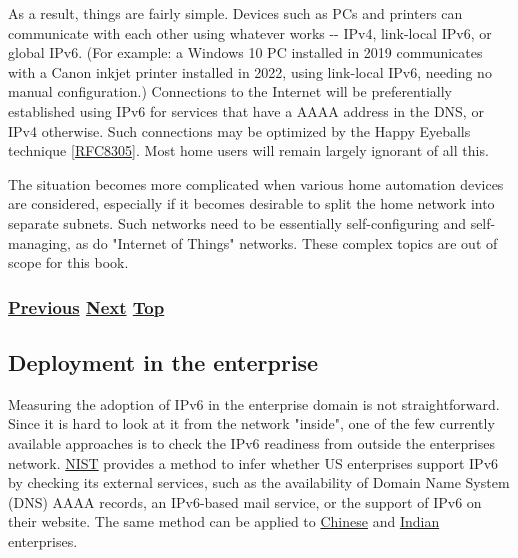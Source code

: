 \documentclass[
]{article}
\begin{document}
As a result, things are fairly simple. Devices such as PCs and printers
can communicate with each other using whatever works -\/- IPv4,
link-local IPv6, or global IPv6. (For example: a Windows 10 PC installed
in 2019 communicates with a Canon inkjet printer installed in 2022,
using link-local IPv6, needing no manual configuration.) Connections to
the Internet will be preferentially established using IPv6 for services
that have a AAAA address in the DNS, or IPv4 otherwise. Such connections
may be optimized by the Happy Eyeballs technique
{[}\href{https://www.rfc-editor.org/info/rfc8305}{RFC8305}{]}. Most home
users will remain largely ignorant of all this.

The situation becomes more complicated when various home automation
devices are considered, especially if it becomes desirable to split the
home network into separate subnets. Such networks need to be essentially
self-configuring and self-managing, as do "Internet of Things" networks.
These complex topics are out of scope for this book.

\subsubsection{\texorpdfstring{\hyperref[deployment-by-carriers]{Previous}
\hyperref[deployment-in-the-enterprise]{Next}
\hyperref[deployment-status]{Top}}{Previous Next Top}}\label{previous-next-top-36}

\pagebreak

\subsection{Deployment in the
enterprise}\label{deployment-in-the-enterprise}

Measuring the adoption of IPv6 in the enterprise domain is not
straightforward. Since it is hard to look at it from the network
"inside", one of the few currently available approaches is to check the
IPv6 readiness from outside the enterprise\textquotesingle s network.
\href{https://fedv6-deployment.antd.nist.gov/cgi-bin/generate-com}{NIST}
provides a method to infer whether US enterprises support IPv6 by
checking its external services, such as the availability of Domain Name
System (DNS) AAAA records, an IPv6-based mail service, or the support of
IPv6 on their website. The same method can be applied to
\href{http://218.2.231.237:5001/cgi-bin/generate}{Chinese} and
\href{https://cnlabs.in/IPv6_Mon/generate_industry.html}{Indian}
enterprises.
\end{document}
